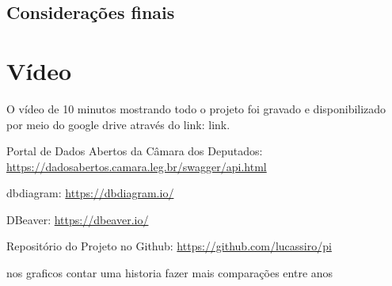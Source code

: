 \documentclass[12pt, a4paper]{article}
\begin{document}
\subsection{Considerações finais}

\section{Vídeo}
O vídeo de 10 minutos mostrando todo o projeto foi gravado e disponibilizado por meio do google drive através do link: link.

\begin{thebibliography}{9}
     Portal de Dados Abertos da Câmara dos Deputados: 
    \href{https://dadosabertos.camara.leg.br/swagger/api.html}{https://dadosabertos.camara.leg.br/swagger/api.html}

     dbdiagram: 
    \href{https://dbdiagram.io/}{https://dbdiagram.io/}
    
     DBeaver: 
    \href{https://dbeaver.io/}{https://dbeaver.io/}

     Repositório do Projeto no Github: 
    \href{https://github.com/lucassiro/pi}{https://github.com/lucassiro/pi}
\end{thebibliography}

nos graficos contar uma historia
fazer mais comparações entre anos
\end{document}
